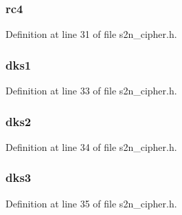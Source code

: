 \subsubsection[{\texorpdfstring{rc4}{rc4}}]{ rc4}\hypertarget{structs2n__session__key_aac8b65d397508abc3246f33122cb88dc}{}\label{structs2n__session__key_aac8b65d397508abc3246f33122cb88dc}


Definition at line 31 of file s2n\+\_\+cipher.\+h.

\subsubsection[{\texorpdfstring{dks1}{dks1}}]{ dks1}\hypertarget{structs2n__session__key_adba02766741157515c73b59862642084}{}\label{structs2n__session__key_adba02766741157515c73b59862642084}


Definition at line 33 of file s2n\+\_\+cipher.\+h.

\subsubsection[{\texorpdfstring{dks2}{dks2}}]{ dks2}\hypertarget{structs2n__session__key_a974b7c512f4618e979aa1dd8447aa6ba}{}\label{structs2n__session__key_a974b7c512f4618e979aa1dd8447aa6ba}


Definition at line 34 of file s2n\+\_\+cipher.\+h.

\subsubsection[{\texorpdfstring{dks3}{dks3}}]{ dks3}\hypertarget{structs2n__session__key_a0431655ea0f8f8b7ab1ee8d8f88171ba}{}\label{structs2n__session__key_a0431655ea0f8f8b7ab1ee8d8f88171ba}


Definition at line 35 of file s2n\+\_\+cipher.\+h.

